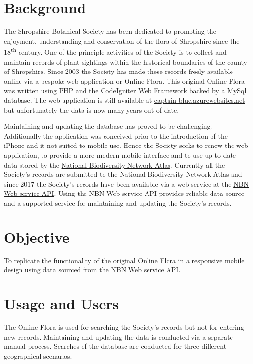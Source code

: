 \documentclass[a4paper,12pt,landscape]{article}
\begin{document}
\begin{multicols*}{2}
  \section{Background}
  The Shropshire Botanical Society
  has been dedicated to promoting the enjoyment,
  understanding and conservation of the flora of Shropshire
  since the 18\textsuperscript{th} century.
  One of the principle activities of the Society is to collect and maintain records 
  of plant sightings within the historical boundaries of the county of Shropshire.
  Since 2003 the Society has made these records freely available online via a bespoke web application
  or Online Flora.
  This original Online Flora was written using
  PHP and the CodeIgniter Web Framework
  backed by a MySql database.
  The web application is still available at 
  \href{https://captain-blue.azurewebsites.net/}{captain-blue.azurewebsites.net}
  but unfortunately the data is now many years out of date.

  Maintaining and updating the database has proved to be challenging.
  Additionally the application was conceived prior to the introduction of the iPhone
  and it not suited to mobile use.
  Hence the Society seeks to renew the web application,
  to provide a more modern mobile interface
  and to use up to date data stored
  by the \href{https://nbnatlas.org/}{National Biodiversity Network Atlas}.
  Currently all the Society's records are submitted to the 
  National Biodiversity Network Atlas
  and since 2017 the Society's records have been available via a web service at
  the \href{https://api.nbnatlas.org/}{NBN Web service API}.
  Using the NBN Web service API provides reliable data source
  and
  a supported service for maintaining and updating the Society's records.

  \vfill\strut\columnbreak

  \section{Objective}
  To replicate the functionality of the original Online Flora
  in a responsive mobile design
  using data sourced from the NBN Web service API.

  \section{Usage and Users}
  The Online Flora is used for searching the Society's records
  but not for entering new records.
  Maintaining and updating the data is conducted via a separate manual process.
  Searches of the database are conducted for three different geographical scenarios.


\end{multicols*}
\end{document}
